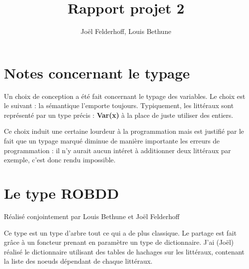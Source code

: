 \documentclass[a4paper,10pt]{article}
\title{Rapport projet 2}
\author{Joël Felderhoff, Louis Bethune}
\begin{document}

\posttitle{\end{center}}
\maketitle

\section{Notes concernant le typage}
Un choix de conception a été fait concernant le typage des variables. Le choix est le suivant : la sémantique l'emporte toujours.
Typiquement, les littéraux sont représenté par un type précis : \textbf{Var(x)} à la place de juste utiliser des entiers.

Ce choix induit une certaine lourdeur à la programmation mais est justifié par le fait que un typage marqué diminue de manière importante les erreurs de programmation : 
il n'y aurait aucun intéret à additionner deux littéraux par exemple, c'est donc rendu impossible.

\section{Le type ROBDD}
Réalisé conjointement par Louis Bethune et Joël Felderhoff

Ce type est un type d'arbre tout ce qui a de plus classique. Le partage est fait grâce à un foncteur prenant en paramètre un type de dictionnaire.
J'ai (Joël) réalisé le dictionnaire utilisant des tables de hachages sur les littéraux, contenant la liste des noeuds dépendant de chaque littéraux.
\end{document}
